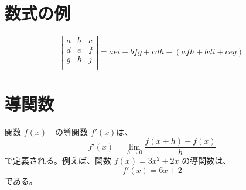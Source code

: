 \documentclass[a4j]{jsarticle}
\begin{document}
\section{数式の例}
\begin{equation} 
 \left|
  \begin{array}{ccc}
      a & b & c \\
      d & e & f \\
      g & h & j \\
    \end{array}
  \right| = aei + bfg + cdh - ( afh + bdi + ceg )
\end{equation}
\section{導関数}
 関数 $f(x)$　の導関数 $f'(x)$は、
  \begin{equation}
    f'(x)=\lim_{h\rightarrow 0}\frac{f(x+h)-f(x)}{h}
  \end{equation}
 で定義される。例えば、関数 $f(x)=3x^2+2x$ の導関数は、
 \[ f'(x)=6x+2 \]
である。
\end{document}
